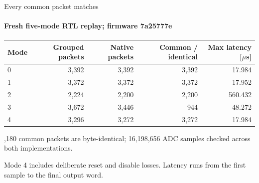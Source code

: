 \begin{frame}{Every common packet matches}
  \framesubtitle{Fresh five-mode RTL replay; firmware 7a25777e}
  \small
  \renewcommand{\arraystretch}{1.3}
  \begin{tabular}{@{}lrrrr@{}}
    \toprule
    Mode & Grouped packets & Native packets & Common / identical & Max latency [$\mu$s] \\
    \midrule
    0 & 3,392 & 3,392 & 3,392 & 17.984 \\
    1 & 3,372 & 3,372 & 3,372 & 17.952 \\
    2 & 2,224 & 2,200 & 2,200 & 560.432 \\
    3 & 3,672 & 3,446 & 944 & 48.272 \\
    4 & 3,296 & 3,272 & 3,272 & 17.984 \\
    \bottomrule
  \end{tabular}\par
  ,180 common packets are byte-identical; 16,198,656 ADC samples checked across both implementations.\par\medskip
  Mode 4 includes deliberate reset and disable losses. Latency runs from the first sample to the final output word.
\end{frame}
